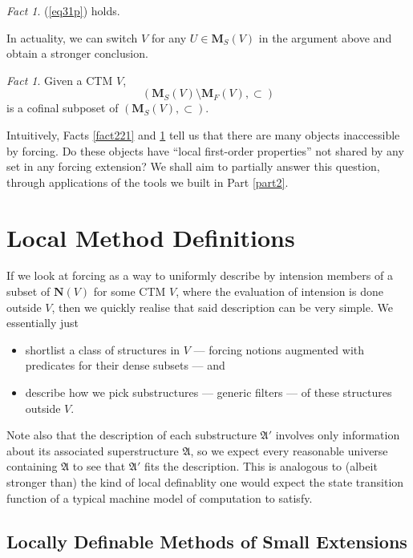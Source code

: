 \documentclass[12pt, twoside]{memoir}
\numberwithin{equation}{section}
\theoremstyle{definition}
\theoremstyle{remark}
\newtheorem{fact}[thm]{Fact}
\theoremstyle{definition}
\theoremstyle{definition}
\theoremstyle{definition}
\theoremstyle{remark}
\begin{document}
\begin{fact}\label{fact319}
(\ref{eq31p}) holds.
\end{fact}

In actuality, we can switch $V$ for any $U \in \mathbf{M}_S(V)$ in the argument above and obtain a stronger conclusion.

\begin{fact}\label{fact229}
Given a CTM $V$,
\begin{equation*}
    (\mathbf{M}_S(V) \setminus \mathbf{M}_F(V), \subset)
\end{equation*}
is a cofinal subposet of $(\mathbf{M}_S(V), \subset)$.
\end{fact}

Intuitively, Facts \ref{fact221} and \ref{fact229} tell us that there are many objects inaccessible by forcing. Do these objects have ``local first-order properties'' not shared by any set in any forcing extension? We shall aim to partially answer this question, through applications of the tools we built in Part \ref{part2}.

\section{Local Method Definitions}

If we look at forcing as a way to uniformly describe by intension members of a subset of $\mathbf{N}(V)$ for some CTM $V$, where the evaluation of intension is done outside $V$, then we quickly realise that said description can be very simple. We essentially just 
\begin{itemize}
    \item shortlist a class of structures in $V$ --- forcing notions augmented with predicates for their dense subsets --- and
    \item describe how we pick substructures --- generic filters --- of these structures outside $V$. 
\end{itemize} 
Note also that the description of each substructure $\mathfrak{A}'$ involves only information about its associated superstructure $\mathfrak{A}$, so we expect every reasonable universe containing $\mathfrak{A}$ to see that $\mathfrak{A}'$ fits the description. This is analogous to (albeit stronger than) the kind of local definablity one would expect the state transition function of a typical machine model of computation to satisfy.

\subsection{Locally Definable Methods of Small Extensions}
\end{document}
